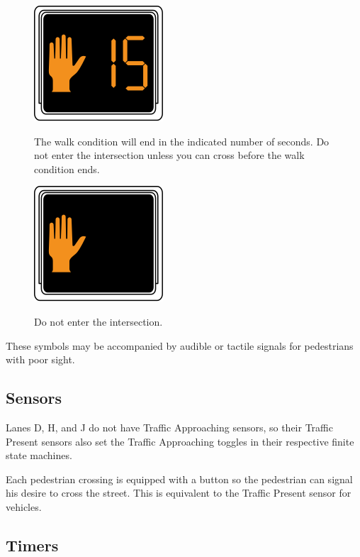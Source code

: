 \documentclass[letterpaper,twoside]{article}
\begin{document}
\begin{figure}[H]
  \fcapside
           {\includegraphics{MUTCD_Ped_Signal_-_Hand_with_timer}}
           {\caption{The walk condition will end in the indicated
               number of seconds.  Do not enter the intersection
               unless you can cross before the walk condition ends.}}
\end{figure}

\begin{figure}[H]
  \fcapside
           {\includegraphics{MUTCD_Ped_Signal_-_Steady_hand}}
           {\caption{Do not enter the intersection.}}
\end{figure}

These symbols may be accompanied by audible or tactile signals for
pedestrians with poor sight.

\subsection{Sensors}

Lanes D, H, and J do not have Traffic Approaching sensors, so their
Traffic Present sensors also set the Traffic Approaching toggles
in their respective finite state machines.

Each pedestrian crossing is equipped with a button so the pedestrian can
signal his desire to cross the street.  This is equivalent to the
Traffic Present sensor for vehicles.

\subsection{Timers}
\end{document}

